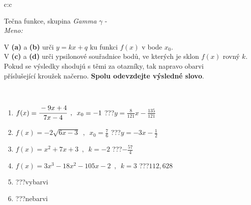 \documentclass[10pt]{report}
\begin{document}
\newpage
\thispagestyle{empty}
\begin{tabular}{c:c}
\begin{minipage}[c][104.5mm][t]{0.5\linewidth}
\begin{center}
\vspace{7mm}
{\huge Tečna funkce, skupina \textit{Gamma $\gamma$} -}\\[5mm]
\textit{Meno:}\phantom{xxxxxxxxxxxxxxxxxxxxxxxxxxxxxxxxxxxxxxxxxxxxxxxxxxxxxxxxxxxxxxxxx}\\[5mm]
\begin{minipage}{0.95\linewidth}
\begin{center}
V \textbf{(a)} a \textbf{(b)} urči  $y = kx + q$ ku funkci $f(x)$ v bode $x_0$.\\V \textbf{(c)} a \textbf{(d)} urči ypsilonové souřadnice bodů, ve kterých je sklon $f(x)$ rovný $k$.\\Pokud se výsledky shodujú s těmi za otazníky, tak napravo obarvi\\příslušející kroužek načerno. \textbf{Spolu odevzdejte výsledné slovo}.
\end{center}
\end{minipage}
\\[1mm]
\begin{minipage}{0.79\linewidth}
\begin{center}
\begin{varwidth}{\linewidth}
\begin{enumerate}
\small
\item $f(x)=\cfrac{-9x+4}{7x-4}\enspace , \enspace x_0=-1$\quad \dotfill\; ???\;\dotfill \quad $y = \frac{8}{121}x-\frac{135}{121}$
\item $f(x)=-2\sqrt{6x-3}\enspace , \enspace x_0=\frac{7}{6}$\quad \dotfill\; ???\;\dotfill \quad $y = -3x-\frac{1}{2}$
\item $f(x)=x^2+7x+3\enspace , \enspace k=-2$\quad \dotfill\; ???\;\dotfill \quad $-\frac{57}{4}$
\item $f(x)=3x^3-18x^2-105x-2\enspace , \enspace k=3$\quad \dotfill\; ???\;\dotfill \quad $112 , 628$
\item \quad \dotfill\; ???\;\dotfill \quad vybarvi
\item \quad \dotfill\; ???\;\dotfill \quad nebarvi
\end{enumerate}
\end{varwidth}
\end{center}
\end{minipage}
\begin{minipage}{0.20\linewidth}

\end{minipage}
\end{center}
\end{minipage}
\end{tabular}
\end{document}
